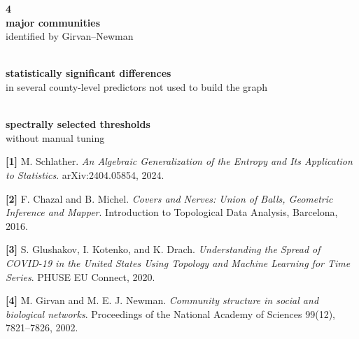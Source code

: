 \documentclass[final]{article}
\newcommand{\posterreferences}{%
  \begin{tcolorbox}[
    posterblockstyle,
    title={References},
    fonttitle=\fontsize{20}{24}\selectfont\bfseries,
    fontupper=\fontsize{13}{16}\selectfont
  ]
    \textbf{[1]} M. Schlather. \emph{An Algebraic Generalization of the Entropy and Its Application to Statistics}. arXiv:2404.05854, 2024.\par\smallskip
    \textbf{[2]} F. Chazal and B. Michel. \emph{Covers and Nerves: Union of Balls, Geometric Inference and Mapper}. Introduction to Topological Data Analysis, Barcelona, 2016.\par\smallskip
    \textbf{[3]} S. Glushakov, I. Kotenko, and K. Drach. \emph{Understanding the Spread of COVID-19 in the United States Using Topology and Machine Learning for Time Series}. PHUSE EU Connect, 2020.\par\smallskip
    \textbf{[4]} M. Girvan and M. E. J. Newman. \emph{Community structure in social and biological networks}. Proceedings of the National Academy of Sciences 99(12), 7821--7826, 2002.
  \end{tcolorbox}
}
\begin{document}
\begin{minipage}[t]{0.48\textwidth}
{    \medskip
    
    \noindent

\begin{minipage}[t]{0.31\linewidth}
    \centering
    \colorbox{gray!10}{
    \parbox{0.90\linewidth}{
        \centering
        {\Large\textbf{4}}\\[-0.2em]
        \textbf{major communities}\\[0.25em]
        identified by Girvan--Newman
    }}
\end{minipage}
\hfill
\begin{minipage}[t]{0.31\linewidth}
    \centering
    \colorbox{gray!10}{
    \parbox{0.90\linewidth}{
        \centering
        {\Large\textbf{}}\\[-0.2em]
        \textbf{statistically significant differences}\\[0.25em]
        in several county-level predictors not used to build the graph
    }}
\end{minipage}
\hfill
\begin{minipage}[t]{0.31\linewidth}
    \centering
    \colorbox{gray!10}{
    \parbox{0.90\linewidth}{
        \centering
        {\Large\textbf{}}\\[-0.2em]
        \textbf{spectrally selected thresholds}\\[0.25em]
        without manual tuning
    }}
\end{minipage}

    \medskip
    }

    \vspace{0.8cm}

    \posterreferences

\end{minipage}
\end{document}
